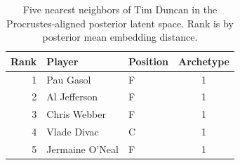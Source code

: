 \begin{table}[htbp]
  \centering\small
  \begin{tabular}{rllc}
    \toprule
    Rank & Player & Position & Archetype \\
    \midrule
    1 & Pau Gasol & F & 1 \\
    2 & Al Jefferson & F & 1 \\
    3 & Chris Webber & F & 1 \\
    4 & Vlade Divac & C & 1 \\
    5 & Jermaine O'Neal & F & 1 \\
    \bottomrule
  \end{tabular}
  \caption{Five nearest neighbors of Tim Duncan in the Procrustes-aligned posterior latent space. Rank is by posterior mean embedding distance.}
  \label{tab:Tim_Duncan_neighbors}
\end{table}

